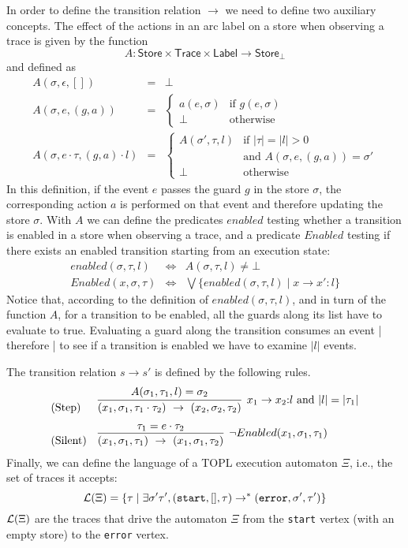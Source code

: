 \documentclass{llncs} %
\newcommand{\set}[1]{\ensuremath{\mathsf{#1}}}
\begin{document}
In order to define the transition relation $\to$ we need to define two auxiliary concepts. 
The effect of the actions in an arc label on a store when observing a trace is given by the function
\[
   A : \set{Store} \times \set{Trace} \times \set{Label} \to \set{Store}_\bot
\] and defined as
%
\begin{eqnarray*}
A(\sigma,\epsilon,[]) & = & \bot
\\[2ex]
A(\sigma,e,(g,a)) & = & \left\{\begin{array}{ll}
     a(e,\sigma) & \mbox{if $g(e,\sigma)$}
     \\[1ex]
     \bot & \mbox{otherwise}
     \end{array}
     \right.
\\[2ex]
A(\sigma,e\cdot \tau,(g,a)\cdot l) & = & \left\{\begin{array}{ll}
     A(\sigma',\tau,l) & \mbox{if $|\tau|=|l|>0$} 
     \\
& \mbox{and  $A(\sigma,e,(g,a))=\sigma'$}
     \\[1ex]
     \bot & \mbox{otherwise}
     \end{array}
     \right.
\end{eqnarray*}
In this definition, if the event $e$ passes the guard $g$ in the store $\sigma$, the corresponding action $a$ is performed on that event
and therefore updating the store $\sigma$.
With $A$ we can define the predicates $enabled$
testing whether a transition is enabled in a store when observing a trace,  and a predicate
$Enabled$ testing if there exists an enabled transition starting from an execution state:
\begin{eqnarray*}
enabled(\sigma,\tau,l) & \Leftrightarrow & A(\sigma,\tau,l) \neq \bot
\\
Enabled(x,\sigma,\tau) & \Leftrightarrow  & \bigvee \{ enabled(\sigma,\tau,l) \mid x \to x' : l \}
\end{eqnarray*}
Notice that, according to the definition of $enabled(\sigma,\tau,l)$, and in turn of the function $A$, 
for a transition to be enabled, all the guards along its
list have to evaluate to true. Evaluating a guard along the transition consumes
an event |  therefore | to see if a transition is enabled 
we have to examine $|l|$ events. 

%
The transition relation $s \to s'$ is defined by the following rules.
\[
\begin{array}{ll}
\text{(Step)}  &
\infer[x_1 \to x_2{:} l \mbox{ and } |l|=|\tau_1| ]{ (x_1,\sigma_1,\tau_1 \cdot \tau_2 ) \  \to \  (x_2, \sigma_2, \tau_2)}{A(\sigma_1,\tau_1,l)=\sigma_2}
\\[2ex]
\text{(Silent)}  & 
\infer[\neg Enabled(x_1,\sigma_1,\tau_1) ]{ (x_1,\sigma_1,\tau_1) \  \to \  (x_1, \sigma_1, \tau_2)}{ \tau_1=e \cdot \tau_2}
\end{array}
\]
Finally, we can define the language of a TOPL execution automaton $\Xi$, i.e., the set of traces it accepts:
\[
{\cal L}(\Xi) = \{ \tau \mid \exists \sigma' \tau', (\mathtt{start},[],\tau) \to^* (\mathtt{error},\sigma',\tau')\}
\]
${\cal L}(\Xi)$ are the traces that drive the automaton $\Xi$ from the \texttt{start} vertex (with an empty store) to the \texttt{error} vertex.
\end{document}
